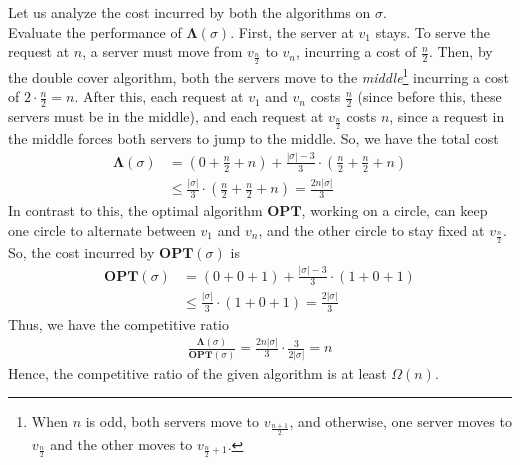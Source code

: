 \documentclass[11pt]{article}
\begin{document}
Let us analyze the cost incurred by both the algorithms on $\sigma$. \\
Evaluate the performance of $\mathbf{\Lambda}(\sigma)$. First, the server at $v_{1}$ stays.
To serve the request at $n$, a server must move from $v_{\frac{n}{2}}$ to $v_{n}$, incurring a cost of $\frac{n}{2}$. Then, by
the double cover algorithm, both the servers move to the \textit{middle}\footnote{When $n$
is odd, both servers move to $v_{\frac{n+1}{2}}$, and otherwise, one server moves to
$v_{\frac{n}{2}}$ and the other moves to $v_{\frac{n}{2} + 1}$.} incurring a cost of $2 \cdot \frac{n}{2} = n$.
After this, each request at $v_{1}$ and $v_{n}$ costs $\frac{n}{2}$ (since before this, these servers must
be in the middle), and each request at $v_{\frac{n}{2}}$ costs $n$, since a request in the
middle forces both servers to jump to the middle. So, we have the total cost
\begin{align}
    \mathbf{\Lambda}(\sigma) &= \left( 0 + \frac{n}{2} + n \right) + \frac{|\sigma| - 3}{3} \cdot \left( \frac{n}{2} + \frac{n}{2} + n \right) \\
    &\leq \frac{|\sigma|}{3} \cdot \left( \frac{n}{2} + \frac{n}{2} + n \right) = \frac{2n|\sigma|}{3}
\end{align}
In contrast to this, the optimal algorithm $\mathbf{OPT}$, working on a circle, can keep
one circle to alternate between $v_{1}$ and $v_{n}$, and the other circle to stay fixed
at $v_{\frac{n}{2}}$. So, the cost incurred by $\mathbf{OPT}(\sigma)$ is
\vfill
\begin{align}
    \mathbf{OPT}(\sigma) &= \left( 0 + 0 + 1 \right) + \frac{|\sigma| - 3}{3} \cdot \left( 1 + 0 + 1 \right) \\
    &\leq \frac{|\sigma|}{3} \cdot \left( 1 + 0 + 1 \right) = \frac{2|\sigma|}{3}
\end{align}
Thus, we have the competitive ratio
\begin{align}
    \frac{\mathbf{\Lambda}(\sigma)}{\mathbf{OPT}(\sigma)} = \frac{2n|\sigma|}{3} \cdot \frac{3}{2|\sigma|} = n
\end{align}
Hence, the competitive ratio of the given algorithm is at least $\Omega(n)$.
\end{document}

